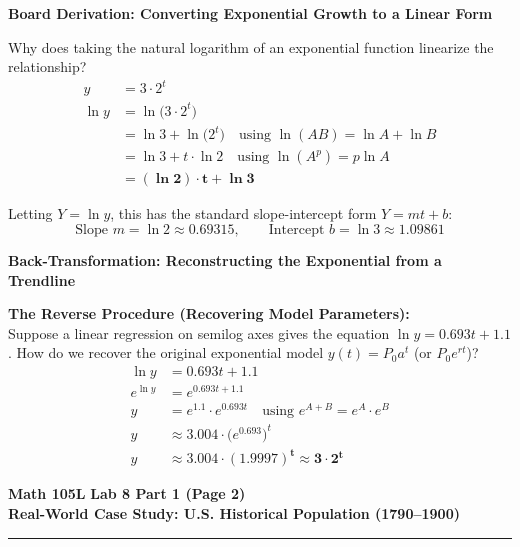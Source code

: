 \documentclass[10.5pt]{article}
\begin{document}
\vspace{0.03in}

\textbf{\large Board Derivation: Converting Exponential Growth to a Linear Form}

Why does taking the natural logarithm of an exponential function linearize the relationship?
\begin{align*}
  y &= 3 \cdot 2^t \\
  \ln y &= \ln\big(3 \cdot 2^t\big) \\
        &= \ln 3 + \ln\big(2^t\big) \quad \text{using } \ln(AB) = \ln A + \ln B \\
        &= \ln 3 + t \cdot \ln 2 \quad \text{using } \ln(A^p) = p \ln A \\
        &= \mathbf{(\ln 2) \cdot t + \ln 3}
\end{align*}

Letting $Y = \ln y$, this has the standard slope-intercept form $Y = m t + b$:
\[
  \text{Slope } m = \ln 2 \approx 0.69315, \qquad \text{Intercept } b = \ln 3 \approx 1.09861
\]

\vspace{0.03in}

\textbf{\large Back-Transformation: Reconstructing the Exponential from a Trendline}

\begin{tcolorbox}[colback=boxbg, colframe=boxframe, boxrule=0.8pt, arc=3pt, left=8pt, right=8pt, top=4pt, bottom=4pt]
\textbf{The Reverse Procedure (Recovering Model Parameters):}\\[2pt]
Suppose a linear regression on semilog axes gives the equation $\ln y = 0.693 t + 1.1$. How do we recover the original exponential model $y(t) = P_0 a^t$ (or $P_0 e^{rt}$)?
\begin{align*}
  \ln y &= 0.693 t + 1.1 \\
  e^{\ln y} &= e^{0.693 t + 1.1} \\
  y &= e^{1.1} \cdot e^{0.693 t} \quad \text{using } e^{A+B} = e^A \cdot e^B \\
  y &\approx 3.004 \cdot \big(e^{0.693}\big)^t \\
  y &\approx \mathbf{3.004 \cdot (1.9997)^t \approx 3 \cdot 2^t}
\end{align*}
\end{tcolorbox}

\newpage

\noindent \textbf{\large Math 105L} \hfill \textbf{\large Lab 8 Part 1 (Page 2)}\\[1pt]
{\textbf{\Large Real-World Case Study: U.S. Historical Population (1790--1900)}}\\[-5pt]
\rule{\textwidth}{1.2pt}
\end{document}

